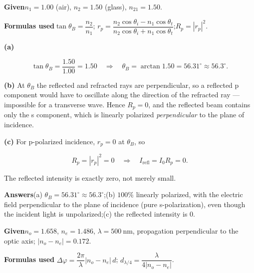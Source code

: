 \documentclass[11pt]{ctexart}
\let\subhdrtheme\subhdr
\renewcommand{\subhdr}[1]{\needspace{4\baselineskip}\subhdrtheme{#1}}
\begin{document}
\textbf{Given}\quad $n_1=1.00$ (air), $n_2=1.50$ (glass), $n_{21}=1.50$.

\textbf{Formulas used}\quad $\tan\theta_B=\dfrac{n_2}{n_1}$;\quad
$r_p=\dfrac{n_2\cos\theta_i-n_1\cos\theta_t}{n_2\cos\theta_i+n_1\cos\theta_t}$;\quad $R_p=|r_p|^2$.

\textbf{(a)}

\[
\tan\theta_B=\frac{1.50}{1.00}=1.50
\quad\Longrightarrow\quad
\theta_B=\arctan 1.50=56.31^\circ\approx56.3^\circ .
\]

\textbf{(b)} At $\theta_B$ the reflected and refracted rays are perpendicular, so a reflected p component
would have to oscillate along the direction of the refracted ray — impossible for a transverse wave.
Hence $R_p=0$, and the reflected beam contains only the s component, which is linearly polarized
\emph{perpendicular} to the plane of incidence.

\textbf{(c)} For p-polarized incidence, $r_p=0$ at $\theta_B$, so

\[
R_p=|r_p|^2=0\quad\Longrightarrow\quad I_{\text{refl}}=I_0R_p=0 .
\]

The reflected intensity is exactly zero, not merely small.

\textbf{Answers}\quad (a) $\theta_B=56.31^\circ\approx56.3^\circ$;\quad (b) $100\%$ linearly polarized,
with the electric field perpendicular to the plane of incidence (pure s-polarization), even though the incident
light is unpolarized;\quad (c) the reflected intensity is $0$.



\textbf{Given}\quad $n_o=1.658$, $n_e=1.486$, $\lambda=500\ \mathrm{nm}$, propagation perpendicular to the
optic axis; $|n_o-n_e|=0.172$.

\textbf{Formulas used}\quad
$\Delta\varphi=\dfrac{2\pi}{\lambda}|n_o-n_e|\,d$;\quad
$d_{\lambda/4}=\dfrac{\lambda}{4|n_o-n_e|}$.
\end{document}
